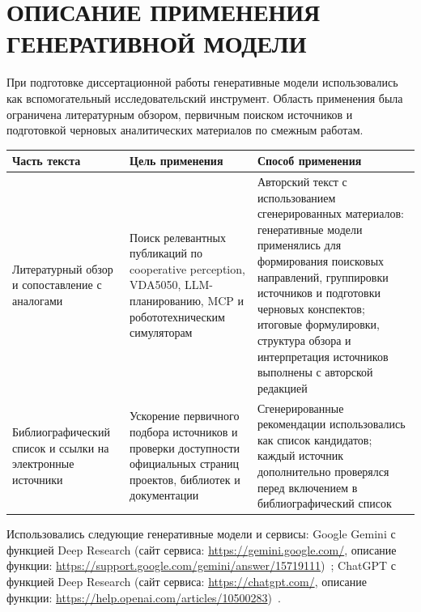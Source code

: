 \documentclass[14pt,a4paper]{extreport}
\begin{document}
\chapter*{ОПИСАНИЕ ПРИМЕНЕНИЯ ГЕНЕРАТИВНОЙ МОДЕЛИ}

При подготовке диссертационной работы генеративные модели использовались как вспомогательный исследовательский инструмент. Область применения была ограничена литературным обзором, первичным поиском источников и подготовкой черновых аналитических материалов по смежным работам.

\begin{longtable}{@{}>{\raggedright\arraybackslash}p{4.6cm}
                  >{\raggedright\arraybackslash}p{3.9cm}
                  >{\raggedright\arraybackslash}p{4.8cm}@{}}
\toprule
\textbf{Часть текста} & \textbf{Цель применения} & \textbf{Способ применения} \\
\midrule
\endhead
Литературный обзор и сопоставление с аналогами & Поиск релевантных публикаций по cooperative perception, VDA5050, LLM-планированию, MCP и робототехническим симуляторам & Авторский текст с использованием сгенерированных материалов: генеративные модели применялись для формирования поисковых направлений, группировки источников и подготовки черновых конспектов; итоговые формулировки, структура обзора и интерпретация источников выполнены с авторской редакцией \\
\midrule
Библиографический список и ссылки на электронные источники & Ускорение первичного подбора источников и проверки доступности официальных страниц проектов, библиотек и документации & Сгенерированные рекомендации использовались как список кандидатов; каждый источник дополнительно проверялся перед включением в библиографический список \\
\bottomrule
\end{longtable}

Использовались следующие генеративные модели и сервисы: Google Gemini с функцией Deep Research (сайт сервиса: \url{https://gemini.google.com/}, описание функции: \url{https://support.google.com/gemini/answer/15719111})~\cite{google_gemini_deep_research}; ChatGPT с функцией Deep Research (сайт сервиса: \url{https://chatgpt.com/}, описание функции: \url{https://help.openai.com/articles/10500283})~\cite{openai_chatgpt_deep_research}.
\end{document}
